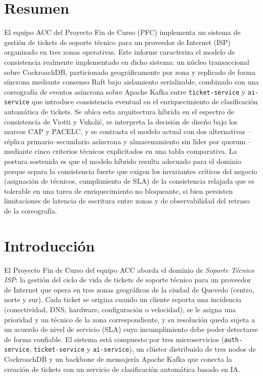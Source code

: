 \documentclass[11pt,a4paper]{article}
\begin{document}
\section*{Resumen}

El equipo ACC del Proyecto Fin de Curso (PFC) implementa un sistema de gesti\'on de tickets de
soporte t\'ecnico para un proveedor de Internet (ISP) organizado en tres zonas operativas. Este
informe caracteriza el modelo de consistencia realmente implementado en dicho sistema: un
n\'ucleo transaccional sobre CockroachDB, particionado geogr\'aficamente por zona y replicado de
forma s\'incrona mediante consenso Raft bajo aislamiento serializable, combinado con una
coreograf\'ia de eventos as\'incrona sobre Apache Kafka entre \texttt{ticket-service} y
\texttt{ai-service} que introduce consistencia eventual en el enriquecimiento de clasificaci\'on
autom\'atica de tickets. Se ubica esta arquitectura h\'ibrida en el espectro de consistencia de
Viotti y Vukoli\'c, se interpreta la decisi\'on de dise\~no bajo los marcos CAP y PACELC, y se
contrasta el modelo actual con dos alternativas -- r\'eplica primario--secundario as\'incrona y
almacenamiento sin l\'ider por quorum -- mediante cinco criterios t\'ecnicos explicitados en una
tabla comparativa. La postura sostenida es que el modelo h\'ibrido resulta adecuado para el
dominio porque separa la consistencia fuerte que exigen los invariantes cr\'iticos del negocio
(asignaci\'on de t\'ecnicos, cumplimiento de SLA) de la consistencia relajada que es tolerable en
una tarea de enriquecimiento no bloqueante, si bien persisten limitaciones de latencia de
escritura entre zonas y de observabilidad del retraso de la coreograf\'ia.

\section{Introducci\'on}

El Proyecto Fin de Curso del equipo ACC aborda el dominio de \emph{Soporte T\'ecnico ISP}: la
gesti\'on del ciclo de vida de tickets de soporte t\'ecnico para un proveedor de Internet que
opera en tres zonas geogr\'aficas de la ciudad de Quevedo (centro, norte y sur). Cada ticket se
origina cuando un cliente reporta una incidencia (conectividad, DNS, hardware, configuraci\'on o
velocidad), se le asigna una prioridad y un t\'ecnico de la zona correspondiente, y su resoluci\'on
queda sujeta a un acuerdo de nivel de servicio (SLA) cuyo incumplimiento debe poder detectarse de
forma confiable. El sistema est\'a compuesto por tres microservicios (\texttt{auth-service},
\texttt{ticket-service} y \texttt{ai-service}), un cl\'uster distribuido de tres nodos de
CockroachDB y un backbone de mensajer\'ia Apache Kafka que conecta la creaci\'on de tickets con un
servicio de clasificaci\'on autom\'atica basado en IA.
\end{document}
